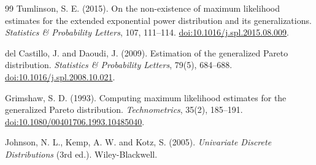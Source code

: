 \documentclass[11pt]{article}
\theoremstyle{plain}
\theoremstyle{definition}
\theoremstyle{remark}
\begin{document}
\begin{thebibliography}{99}
 Tumlinson, S. E. (2015). On the non-existence of
maximum likelihood estimates for the extended exponential power
distribution and its generalizations. \emph{Statistics \& Probability
Letters}, 107, 111--114.
\href{https://doi.org/10.1016/j.spl.2015.08.009}{doi:10.1016/j.spl.2015.08.009}.

 del Castillo, J. and Daoudi, J. (2009).
Estimation of the generalized Pareto distribution. \emph{Statistics \&
Probability Letters}, 79(5), 684--688.
\href{https://doi.org/10.1016/j.spl.2008.10.021}{doi:10.1016/j.spl.2008.10.021}.

 Grimshaw, S. D. (1993). Computing maximum likelihood
estimates for the generalized Pareto distribution. \emph{Technometrics},
35(2), 185--191.
\href{https://doi.org/10.1080/00401706.1993.10485040}{doi:10.1080/00401706.1993.10485040}.

 Johnson, N. L., Kemp, A. W. and Kotz, S. (2005).
\emph{Univariate Discrete Distributions} (3rd ed.). Wiley-Blackwell.

\end{thebibliography}
\end{document}
